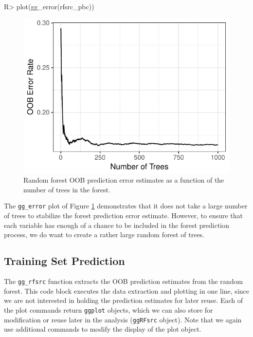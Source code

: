 \documentclass[article, nojss]{jss}
\begin{document}
\begin{Schunk}
\begin{Sinput}
R> plot(gg_error(rfsrc_pbc))
\end{Sinput}
\begin{figure}[!htb]

{\centering \includegraphics{rfs-errorPlot-1}

}

\caption[Random forest OOB prediction error estimates as a function of the number of trees in the forest]{Random forest OOB prediction error estimates as a function of the number of trees in the forest.}\label{fig:errorPlot}
\end{figure}
\end{Schunk}

The \texttt{gg\_error} plot of Figure \ref{fig:errorPlot} demonstrates
that it does not take a large number of trees to stabilize the forest
prediction error estimate. However, to ensure that each variable has
enough of a chance to be included in the forest prediction process, we
do want to create a rather large random forest of trees.

\subsection{Training Set Prediction}\label{training-set-prediction}

The \texttt{gg\_rfsrc} function extracts the OOB prediction estimates
from the random forest. This code block executes the data extraction and
plotting in one line, since we are not interested in holding the
prediction estimates for later reuse. Each of the 
plot commands return \texttt{ggplot} objects, which we can also store
for modification or reuse later in the analysis (\texttt{ggRFsrc}
object). Note that we again use additional  commands to
modify the display of the plot object.
\end{document}
